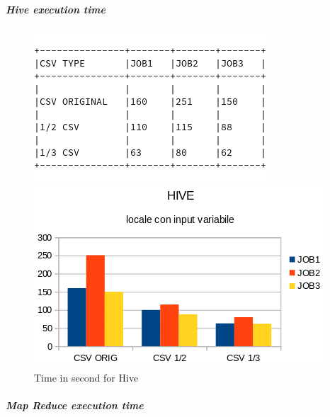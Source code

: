 \documentclass[]{report}
\begin{document}
\subparagraph*{Hive execution time}
\begin{center}
	\begin{figure}[!htb]
		\begin{minipage}[c]{.40\textwidth}
			\vspace{2 cm}
			\includegraphics[width=1 \linewidth]{figure/hivetime}
			\caption{Time in second for Hive}
		\end{minipage}
		\begin{minipage}{.40\textwidth}
						\hspace{1 cm}
			\includegraphics[width=2 \linewidth]{figure/hivechart}
		\end{minipage}
	\end{figure}
\end{center}	
\newpage
\subparagraph*{Map Reduce execution time}
\end{document}
